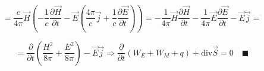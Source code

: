 \[
= \frac{c}{4\pi} \vec{H} \left( -\frac{1}{c}\frac{\partial\vec{H}}{\partial t} -\vec{E}\left( \frac{4\pi}{c}\vec{j}+\frac{1}{c}\frac{\partial\vec{E}}{\partial t}    \right)  \right) =-\frac{1}{4\pi}\vec{H}\frac{\partial\vec{H}}{\partial t}-\frac{1}{4\pi}\vec{E}\frac{\partial\vec{E}}{\partial t}-\vec{E}\vec{j}=    
\]

\[
=\frac{\partial}{\partial t}\left( \frac{H^2}{8\pi}+\frac{E^2}{8\pi}   \right) -\vec{E}\vec{j}\Rightarrow \frac{\partial}{\partial t} \left( W_E+W_M+q \right)+\mathrm{div}\vec{S}=0\quad \blacksquare 
\]
